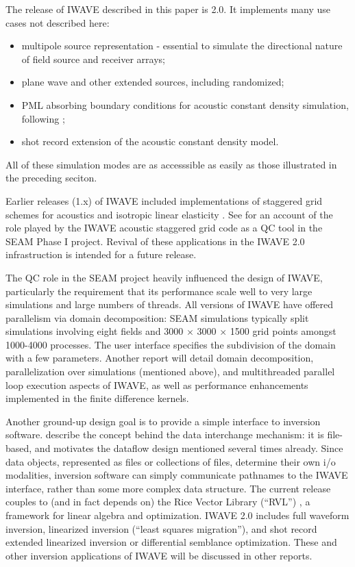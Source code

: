 {The release of IWAVE described in this paper is 2.0. It implements many use
cases not described here:  
\begin{itemize}
\item multipole source representation - essential to simulate the
  directional nature of field source and receiver arrays;
\item plane wave and other extended sources, including randomized;
\item PML absorbing boundary conditions for acoustic constant density
  simulation, following \cite{GrotePML:10};
\item shot record extension of the acoustic constant density model.
  \cite[]{KerSy:94}
\end{itemize}
All of these simulation modes are as accesssible as easily as those
illustrated in the preceding seciton.

Earlier releases (1.x) of IWAVE included implementations of staggered
grid schemes for acoustics and isotropic linear elasticity
\cite[]{moczoetal:06}. See  \cite{FehlerKeliher:11} for an account of
the role played by the IWAVE acoustic staggered grid code as a QC tool
in the SEAM Phase I project. Revival 
of these applications in the IWAVE 2.0 infrastruction is intended
for a future release.

The QC role in the SEAM project heavily influenced the design of 
IWAVE, particularly the requirement that its performance scale well to
very large simulations and large numbers of threads. All versions of
IWAVE have offered parallelism via domain decomposition: SEAM
simulations typically split simulations involving eight fields and
3000 $\times$ 3000 $\times$ 1500 grid points amongst 1000-4000
processes. The user interface specifies the subdivision of the domain
with a few parameters. Another report will detail domain
decomposition, parallelization over simulations (mentioned above), and
multithreaded parallel loop execution aspects of IWAVE, as well as
performance enhancements implemented in the finite difference kernels.

Another ground-up design goal is to provide a simple interface to
inversion software. \cite{Geopros:11} describe the concept behind
the data interchange mechanism: it is file-based, and motivates the
dataflow design mentioned several times already. Since data objects,
represented as files or collections of files, determine their own i/o
modalities, inversion software can simply communicate pathnames to the
IWAVE interface, rather than some more complex data structure. The
current release couples to (and in fact depends on)
the Rice Vector Library (``RVL'') \cite[]{RVLTOMS}, a
framework for linear algebra and optimization.
IWAVE 2.0 includes full waveform inversion, linearized inversion
(``least squares migration''), and shot record extended linearized inversion or
differential semblance optimization. These and other inversion
applications of IWAVE will be discussed in other reports.

}
